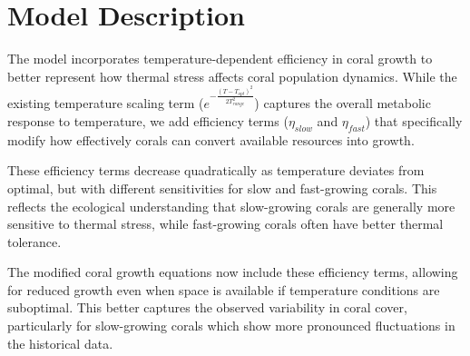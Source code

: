 \section{Model Description}

The model incorporates temperature-dependent efficiency in coral growth to better represent how thermal stress affects coral population dynamics. While the existing temperature scaling term ($e^{-\frac{(T-T_{opt})^2}{2T_{range}^2}}$) captures the overall metabolic response to temperature, we add efficiency terms ($\eta_{slow}$ and $\eta_{fast}$) that specifically modify how effectively corals can convert available resources into growth.

These efficiency terms decrease quadratically as temperature deviates from optimal, but with different sensitivities for slow and fast-growing corals. This reflects the ecological understanding that slow-growing corals are generally more sensitive to thermal stress, while fast-growing corals often have better thermal tolerance.

The modified coral growth equations now include these efficiency terms, allowing for reduced growth even when space is available if temperature conditions are suboptimal. This better captures the observed variability in coral cover, particularly for slow-growing corals which show more pronounced fluctuations in the historical data.
